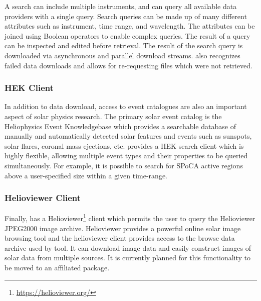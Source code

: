 A \Fido search can include multiple instruments, and can query all available data providers with a single query.
Search queries can be made up of many different attributes such as instrument, time range, and wavelength.
The attributes can be joined using Boolean operators to enable complex queries.
The result of a query can be inspected and edited before retrieval.
The result of the \Fido search query is downloaded via asynchronous and parallel download streams.
\Fido also recognizes failed data downloads and allows for re-requesting files which were not retrieved.

\subsubsection{HEK Client}
\label{sec:hek}

In addition to data download, access to event catalogues are also an important aspect of solar physics research.
The primary solar event catalog is the Heliophysics Event Knowledgebase \citep[HEK,][]{hek} which provides a searchable database of manually and automatically detected solar features and events such as sunspots, solar flares, coronal mass ejections, etc. \sunpypkg provides a HEK search client which is highly flexible, allowing multiple event types and their properties to be queried simultaneously.
For example, it is possible to search for SPoCA \citep{2014AA...561A..29V} active regions above a user-specified size within a given time-range.

\subsubsection{Helioviewer Client}
\label{sec:helioviewer}

Finally,  has a Helioviewer\footnote{\url{https://helioviewer.org/}} client which permits the user to query the Helioviewer JPEG2000 image archive.
Helioviewer provides a powerful online solar image browsing tool and the helioviewer client provides access to the browse data archive used by tool.
It can download image data and easily construct images of solar data from multiple sources.
It is currently planned for this functionality to be moved to an affiliated package.
